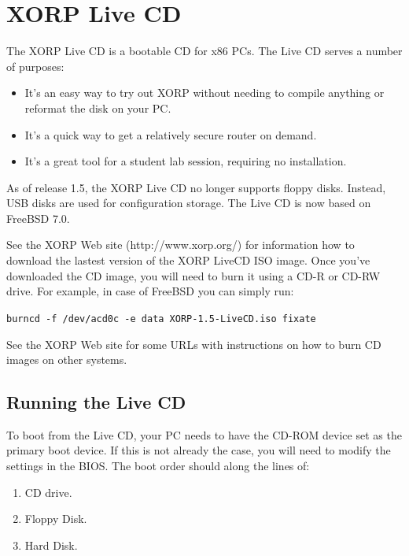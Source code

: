 %
%

\chapter{XORP Live CD}
\label{livecd}

The XORP Live CD is a bootable CD for x86 PCs.
The Live CD serves a number of purposes:

\begin{itemize}

  \item It's an easy way to try out XORP without needing to
  compile anything or reformat the disk on your PC.
  \item It's a quick way to get a relatively secure router on demand.
  \item It's a great tool for a student lab session, requiring no
  installation.

\end{itemize}

As of release 1.5, the XORP Live CD no longer supports floppy disks. Instead,
USB disks are used for configuration storage. The Live CD is now based on
FreeBSD 7.0.

See the XORP Web site ({\stt http://www.xorp.org/}) for information
how to download the lastest version of the XORP LiveCD ISO image.
Once you've downloaded the CD image, you will need to burn it using a
CD-R or CD-RW drive. For example, in case of FreeBSD you can simply run:

{\tt burncd -f /dev/acd0c -e data XORP-1.5-LiveCD.iso fixate}

See the XORP Web site for some URLs with instructions on how to burn CD images
on other systems.

\section{Running the Live CD}

To boot from the Live CD, your PC needs to have the CD-ROM device
set as the primary boot device.  If this is not already the case, you will
need to modify the settings in the BIOS.  The boot order should along the
lines of:

\begin{enumerate}
  \item CD drive.
  \item Floppy Disk.
  \item Hard Disk.
\end{enumerate}

